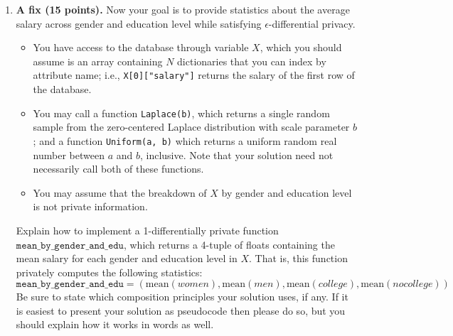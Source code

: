 \documentclass[10pt]{article}
\begin{document}
\begin{enumerate}
\item \textbf{A fix (15 points).}
Now your goal is to provide statistics about the average salary across gender and education level while satisfying $\epsilon$-differential privacy.
\begin{itemize}
\item You have access to the database through variable $X$, which you should assume is an array containing $N$ dictionaries that you can index by attribute name; i.e., \verb'X[0]["salary"]' returns the salary of the first row of the database.
\item You may call a function \verb'Laplace(b)', which returns a single random sample from the zero-centered Laplace distribution with scale parameter $b$; and a function \verb'Uniform(a, b)' which returns a uniform random real number between $a$ and $b$, inclusive. Note that your solution need not necessarily call both of these functions.
\item You may assume that the breakdown of $X$ by gender and education level is not private information.
\end{itemize}
Explain how to implement a 1-differentially private function $\mathtt{mean\_by\_gender\_and\_edu}$, which returns a 4-tuple of floats containing the mean salary for each gender and education level in $X$. That is, this function privately computes the following statistics:
\[
\mathtt{mean\_by\_gender\_and\_edu} = (\mathrm{mean}(\mathit{women}), \mathrm{mean}(\mathit{men}), \mathrm{mean}(\mathit{college}), \mathrm{mean}(\mathit{no college}))
\]
Be sure to state which composition principles your solution uses, if any.
If it is easiest to present your solution as pseudocode then please do so, but you should explain how it works in words as well.

\end{enumerate}
\end{document}
